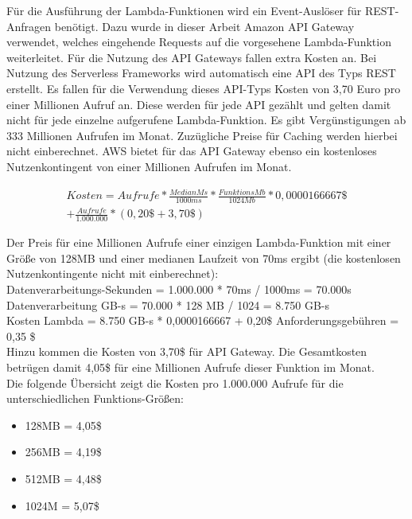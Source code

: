 Für die Ausführung der Lambda-Funktionen wird ein Event-Auslöser für REST-Anfragen benötigt. Dazu wurde in dieser Arbeit Amazon API Gateway verwendet, welches eingehende Requests auf die vorgesehene Lambda-Funktion weiterleitet. Für die Nutzung des API Gateways fallen extra Kosten an. Bei Nutzung des Serverless Frameworks wird automatisch eine API des Typs REST erstellt. Es fallen für die Verwendung dieses API-Typs Kosten von 3,70 Euro pro einer Millionen Aufruf an. Diese werden für jede API gezählt und gelten damit nicht für jede einzelne aufgerufene Lambda-Funktion. Es gibt Vergünstigungen ab 333 Millionen Aufrufen im Monat. Zuzügliche Preise für Caching werden hierbei nicht einberechnet. AWS bietet für das API Gateway ebenso ein kostenloses Nutzenkontingent von einer Millionen Aufrufen im Monat\cite{noauthor_amazon_nodate}.

\begin{equation}
\begin{split}
Kosten = Aufrufe * \frac{MedianMs}{1000ms} * \frac{FunktionsMb}{1024Mb} * 0,0000166667\$ \\
+ \frac{Aufrufe}{1.000.000} * (0,20\$ + 3,70\$)
\end{split}
\end{equation}

Der Preis für eine Millionen Aufrufe einer einzigen Lambda-Funktion mit einer Größe von 128MB und einer medianen Laufzeit von 70ms ergibt (die kostenlosen Nutzenkontingente nicht mit einberechnet): \\

Datenverarbeitungs-Sekunden = 1.000.000 * 70ms / 1000ms = 70.000s   \\
Datenverarbeitung GB-s = 70.000 * 128 MB / 1024 = 8.750 GB-s    \\
Kosten Lambda = 8.750 GB-s * 0,0000166667 + 0,20\$ Anforderungsgebühren = 0,35 \$     \\

Hinzu kommen die Kosten von 3,70\$ für API Gateway. Die Gesamtkosten betrügen damit 4,05\$ für eine Millionen Aufrufe dieser Funktion im Monat.    \\

Die folgende Übersicht zeigt die Kosten pro 1.000.000 Aufrufe für die unterschiedlichen Funktions-Größen:
\begin{itemize}
    \item 128MB = 4,05\$
    \item 256MB = 4,19\$
    \item 512MB = 4,48\$
    \item 1024M = 5,07\$
\end{itemize}

